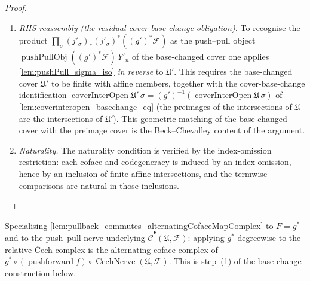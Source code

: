 \begin{proof}
\begin{enumerate}
    \item \emph{RHS reassembly (the residual cover-base-change obligation).} To recognise the
      product \(\prod_\sigma (j'_\sigma)_*(j'_\sigma)^*((g')^*\mathcal{F})\) as the push--pull
      object \(\operatorname{pushPullObj}((g')^*\mathcal{F})\, Y'_n\) of the base-changed cover
      one applies \cref{lem:pushPull_sigma_iso} \emph{in reverse} to \(\mathfrak{U}'\). This
      requires the base-changed cover \(\mathfrak{U}'\) to be finite with affine members,
      together with the cover-base-change identification
      \(\operatorname{coverInterOpen}\mathfrak{U}'\,\sigma = (g')^{-1}
      (\operatorname{coverInterOpen}\mathfrak{U}\,\sigma)\) of
      \cref{lem:coverinteropen_basechange_eq} (the preimages of the intersections
      of \(\mathfrak{U}\) are the intersections of \(\mathfrak{U}'\)). This geometric matching
      of the base-changed cover with the preimage cover is the Beck--Chevalley content of the
      argument.
    \item \emph{Naturality.} The naturality condition is verified by the index-omission
      restriction: each coface and codegeneracy is induced by an index omission, hence by
      an inclusion of finite affine intersections, and the termwise comparisons are natural
      in those inclusions.
  \end{enumerate}
\end{proof}

\begin{definition}
  \label{def:pullback_cechComplex_alternatingIso}
  Specialising \cref{lem:pullback_commutes_alternatingCofaceMapComplex} to \(F = g^*\)
  and to the push--pull nerve underlying \(\check{\mathcal{C}}^\bullet(\mathfrak{U},
  \mathcal{F})\): applying \(g^*\) degreewise to the relative {\v C}ech complex is the
  alternating-coface complex of \(g^* \circ (\operatorname{pushforward} f) \circ
  \operatorname{CechNerve}(\mathfrak{U}, \mathcal{F})\). This is step~(1) of the
  base-change construction below.
\end{definition}

